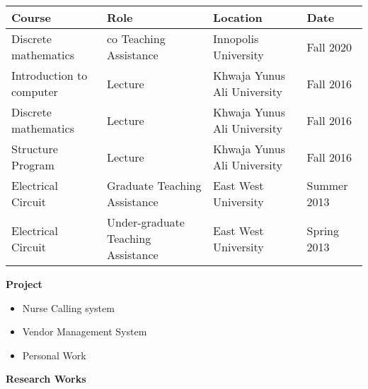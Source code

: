 \documentclass[letterpaper,10pt]{article}
\newcommand{\resitem}[1]{\item #1 \vspace{-2pt}}
\newcommand{\resheading}[1]{{\large \colorbox{mygrey}{\begin{minipage}{\textwidth}{\textbf{#1 \vphantom{p\^{E}}}}\end{minipage}}}}
\begin{document}
\begin{table}[H]
    \centering
    \begin{tabularx}{\columnwidth}{XXXX} 
    \hline
        Course & Role & Location  & Date \\ \hline
        
        Discrete mathematics & co Teaching Assistance & Innopolis University & Fall 2020 \\ 
        Introduction to computer & Lecture & Khwaja Yunus Ali University & Fall 2016 \\ 
        Discrete mathematics & Lecture & Khwaja Yunus Ali University & Fall 2016 \\ 
        Structure Program & Lecture & Khwaja Yunus Ali University & Fall 2016 \\ 
        
        Electrical Circuit & Graduate Teaching Assistance & East West University & Summer 2013 \\
        Electrical Circuit & Under-graduate Teaching Assistance & East West University & Spring 2013 \\
         \hline
    \end{tabularx}

\end{table}

\resheading{Project}

\begin{itemize}
\resitem{Nurse Calling system}
\resitem{Vendor Management System}
\resitem{Personal Work}
\end{itemize}

\resheading{Research Works}
\end{document}
